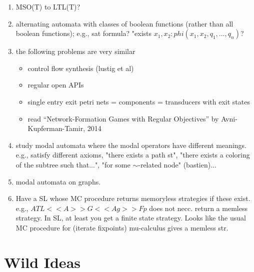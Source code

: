 \documentclass[a4paper,10pt]{article}
\begin{document}
\begin{enumerate}
\item MSO(T) to  LTL(T)?


\item 
alternating automata with classes of boolean functions (rather than all boolean functions);
e.g., sat formula? "exists $x_1, x_2: phi(x_1,x_2,q_1,...,q_n)$?

\item 
the following problems are very similar
\begin{itemize}
\item control flow synthesis (lustig et al) 
\item regular open APIs
\item single entry exit petri nets = components = transducers with exit states
\item 	read “Network-Formation Games with
Regular Objectives” by Avni-Kupferman-Tamir,
2014
\end{itemize}
\item
study modal automata where the modal operators have different meanings.
e.g., satisfy different axioms, "there exists a path st", "there exists a coloring of the subtree such that...",
"for some $\sim$-related node" (bastien)...

\item modal automata on graphs.

\item Have a SL whose MC procedure returns memoryless strategies if these exist.
e.g., $ATL <<A>>G<<Ag>>Fp$ does not necc. return a memless strategy.
In SL, at least you get a finite state strategy.
Looks like the usual MC procedure for (iterate fixpoints) mu-calculus gives a memless str.
\end{enumerate}


\section{Wild Ideas}
\end{document}
